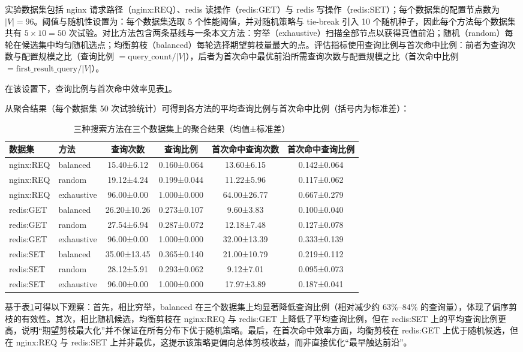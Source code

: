 \documentclass[UTF8,a4paper,12pt,twoside]{ctexart}  %
\begin{document}
实验数据集包括 nginx 请求路径（nginx:REQ）、redis 读操作（redis:GET）与
redis 写操作（redis:SET）；每个数据集的配置节点数为
\(|V|=96\)。阈值与随机性设置为：每个数据集选取 5
个性能阈值，并对随机策略与 tie-break 引入 10
个随机种子，因此每个方法每个数据集共有 \(5\times 10=50\)
次试验。对比方法包含两条基线与一条本文方法：穷举（exhaustive）扫描全部节点以获得真值前沿；随机（random）每轮在候选集中均匀随机选点；均衡剪枝（balanced）每轮选择期望剪枝量最大的点。评估指标使用查询比例与首次命中比例：前者为查询次数与配置规模之比（查询比例
\(=\text{query\_count}/|V|\)），后者为首次命中最优前沿所需查询次数与配置规模之比（首次命中比例
\(=\text{first\_result\_query}/|V|\)）。

在该设置下，查询比例与首次命中效率见表\ref{tab:search-agg-results}。

从聚合结果（每个数据集 50
次试验统计）可得到各方法的平均查询比例与首次命中比例（括号内为标准差）：
\begin{table}[htbp]
\centering
\small
\setlength{\tabcolsep}{4pt}
\begin{tabular}{llcccc}
\toprule
数据集 & 方法 & 查询次数 & 查询比例 & 首次命中查询次数 & 首次命中查询比例 \\
\midrule
nginx:REQ & balanced & 15.40±6.12 & 0.160±0.064 & 13.60±6.15 & 0.142±0.064 \\
nginx:REQ & random & 19.12±4.24 & 0.199±0.044 & 11.22±5.96 & 0.117±0.062 \\
nginx:REQ & exhaustive & 96.00±0.00 & 1.000±0.000 & 64.00±26.77 & 0.667±0.279 \\
redis:GET & balanced & 26.20±10.26 & 0.273±0.107 & 9.60±3.83 & 0.100±0.040 \\
redis:GET & random & 27.54±6.94 & 0.287±0.072 & 12.18±7.48 & 0.127±0.078 \\
redis:GET & exhaustive & 96.00±0.00 & 1.000±0.000 & 32.00±13.39 & 0.333±0.139 \\
redis:SET & balanced & 35.00±13.45 & 0.365±0.140 & 21.00±10.79 & 0.219±0.112 \\
redis:SET & random & 28.12±5.91 & 0.293±0.062 & 9.12±7.01 & 0.095±0.073 \\
redis:SET & exhaustive & 96.00±0.00 & 1.000±0.000 & 17.97±3.89 & 0.187±0.041 \\
\bottomrule
\end{tabular}
\caption{三种搜索方法在三个数据集上的聚合结果（均值±标准差）}
\label{tab:search-agg-results}
\end{table}

基于表\ref{tab:search-agg-results}可得以下观察：首先，相比穷举，balanced 在三个数据集上均显著降低查询比例（相对减少约
63\%--84\%
的查询量），体现了偏序剪枝的有效性。其次，相比随机候选，均衡剪枝在
nginx:REQ 与 redis:GET 上降低了平均查询比例，但在 redis:SET
上的平均查询比例更高，说明``期望剪枝最大化''并不保证在所有分布下优于随机策略。最后，在首次命中效率方面，均衡剪枝在
redis:GET 上优于随机候选，但在 nginx:REQ 与 redis:SET
上并非最优，这提示该策略更偏向总体剪枝收益，而非直接优化``最早触达前沿''。
\end{document}
